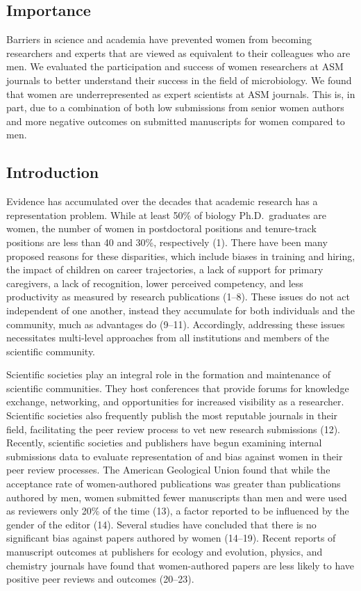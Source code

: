 \documentclass[11pt,]{article}
\begin{document}
\subsection{Importance}\label{importance}

Barriers in science and academia have prevented women from becoming
researchers and experts that are viewed as equivalent to their
colleagues who are men. We evaluated the participation and success of
women researchers at ASM journals to better understand their success in
the field of microbiology. We found that women are underrepresented as
expert scientists at ASM journals. This is, in part, due to a
combination of both low submissions from senior women authors and more
negative outcomes on submitted manuscripts for women compared to men.

\subsection{Introduction}\label{introduction}

Evidence has accumulated over the decades that academic research has a
representation problem. While at least 50\% of biology Ph.D.~graduates
are women, the number of women in postdoctoral positions and
tenure-track positions are less than 40 and 30\%, respectively (1).
There have been many proposed reasons for these disparities, which
include biases in training and hiring, the impact of children on career
trajectories, a lack of support for primary caregivers, a lack of
recognition, lower perceived competency, and less productivity as
measured by research publications (1--8). These issues do not act
independent of one another, instead they accumulate for both individuals
and the community, much as advantages do (9--11). Accordingly,
addressing these issues necessitates multi-level approaches from all
institutions and members of the scientific community.

Scientific societies play an integral role in the formation and
maintenance of scientific communities. They host conferences that
provide forums for knowledge exchange, networking, and opportunities for
increased visibility as a researcher. Scientific societies also
frequently publish the most reputable journals in their field,
facilitating the peer review process to vet new research submissions
(12). Recently, scientific societies and publishers have begun examining
internal submissions data to evaluate representation of and bias against
women in their peer review processes. The American Geological Union
found that while the acceptance rate of women-authored publications was
greater than publications authored by men, women submitted fewer
manuscripts than men and were used as reviewers only 20\% of the time
(13), a factor reported to be influenced by the gender of the editor
(14). Several studies have concluded that there is no significant bias
against papers authored by women (14--19). Recent reports of manuscript
outcomes at publishers for ecology and evolution, physics, and chemistry
journals have found that women-authored papers are less likely to have
positive peer reviews and outcomes (20--23).
\end{document}
